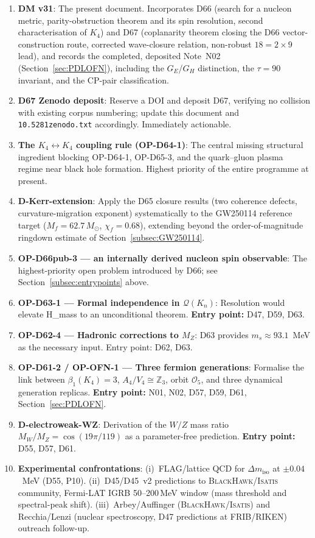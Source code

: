 \documentclass[11pt,a4paper]{article}
\theoremstyle{plain}
\theoremstyle{definition}
\theoremstyle{remark}
\begin{document}
\begin{enumerate}
\item \textbf{DM v31}: The present document. Incorporates D66 (search for a nucleon metric, parity-obstruction theorem and its spin resolution, second characterisation of $K_4$) and D67 (coplanarity theorem closing the D66 vector-construction route, corrected wave-closure relation, non-robust $18=2\times9$ lead), and records the completed, deposited Note~N02 (Section~\ref{sec:PDLOFN}), including the $G_E$/$G_H$ distinction, the $\tau=90$ invariant, and the CP-pair classification.
\item \textbf{D67 Zenodo deposit}: Reserve a DOI and deposit D67, verifying no collision with existing corpus numbering; update this document and \texttt{10.5281zenodo.txt} accordingly. Immediately actionable.
\item \textbf{The $K_4\leftrightarrow K_4$ coupling rule (OP-D64-1)}: The central missing structural ingredient blocking OP-D64-1, OP-D65-3, and the quark--gluon plasma regime near black hole formation. Highest priority of the entire programme at present.
\item \textbf{D-Kerr-extension}: Apply the D65 closure results (two coherence defects, curvature-migration exponent) systematically to the GW250114 reference target ($M_f=62.7\,M_\odot$, $\chi_f=0.68$), extending beyond the order-of-magnitude ringdown estimate of Section~\ref{subsec:GW250114}.
\item \textbf{OP-D66pub-3 --- an internally derived nucleon spin observable}: The highest-priority open problem introduced by D66; see Section~\ref{subsec:entrypoints} above.
\item \textbf{OP-D63-1 --- Formal independence in $\mathcal{Q}(K_n)$}: Resolution would elevate H\_mass to an unconditional theorem. \textbf{Entry point:} D47, D59, D63.
\item \textbf{OP-D62-4 --- Hadronic corrections to $M_Z$}: D63 provides $m_s \approx 93.1$~MeV as the necessary input. Entry point: D62, D63.
\item \textbf{OP-D61-2 / OP-OFN-1 --- Three fermion generations}: Formalise the link between $\beta_1(K_4) = 3$, $A_4/V_4 \cong \mathbb{Z}_3$, orbit $\mathcal{O}_5$, and three dynamical generation replicas. \textbf{Entry point:} N01, N02, D57, D59, D61, Section~\ref{sec:PDLOFN}.
\item \textbf{D-electroweak-WZ}: Derivation of the $W/Z$ mass ratio $M_W/M_Z = \cos(19\pi/119)$ as a parameter-free prediction. \textbf{Entry point:} D55, D57, D61.
\item \textbf{Experimental confrontations}: (i)~FLAG/lattice QCD for $\Delta m_{\mathrm{iso}}$ at $\pm 0.04$~MeV (D55, P10). (ii)~D45/D45~v2 predictions to \textsc{BlackHawk}/\textsc{Isatis} community, Fermi-LAT IGRB 50--200\,MeV window (mass threshold and spectral-peak shift). (iii)~Arbey/Auffinger (\textsc{BlackHawk}/\textsc{Isatis}) and Recchia/Lenzi (nuclear spectroscopy, D47 predictions at FRIB/RIKEN) outreach follow-up.

\end{enumerate}
\end{document}
